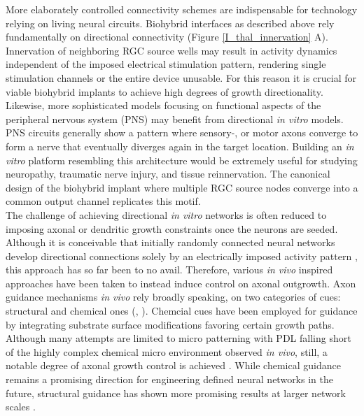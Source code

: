 More elaborately controlled connectivity schemes are indispensable for
technology relying on living neural circuits. Biohybrid interfaces as described
above rely fundamentally on directional connectivity (Figure
\ref{I_thal_innervation} A). Innervation of neighboring RGC source wells may
result in activity dynamics independent of the imposed electrical stimulation
pattern, rendering single stimulation channels or the entire device unusable.
For this reason it is crucial for viable biohybrid implants to achieve high
degrees of growth directionality. \\
Likewise, more sophisticated models focusing on functional aspects of the
peripheral nervous system (PNS) may benefit from directional \textit{in vitro}
models. PNS circuits generally show a pattern where sensory-, or motor axons
converge to form a nerve that eventually diverges again in the target location.
Building an \textit{in vitro} platform resembling this architecture would be
extremely useful for studying neuropathy, traumatic nerve injury, and tissue
reinnervation. The canonical design of the biohybrid implant where multiple RGC
source nodes converge into a common output channel replicates this motif. \\


The challenge of achieving directional \textit{in vitro} networks is often
reduced to imposing axonal or dendritic growth constraints once the neurons are
seeded. Although it is conceivable that initially randomly connected neural
networks develop directional connections solely by an electrically imposed
activity pattern \parencite{stdp}, this approach has so far been to no avail.
Therefore, various \textit{in vivo} inspired approaches have been taken to
instead induce control on axonal outgrowth. Axon guidance mechanisms \textit{in
vivo} rely broadly speaking, on two categories of cues: structural and chemical
ones (\cite{mechanicalcues}, \cite{chemicalcues}). Chemcial cues have been
employed for guidance by integrating substrate surface modifications favoring
certain growth paths. Although many attempts are limited to micro patterning
with PDL falling short of the highly complex chemical micro environment observed
\textit{in vivo}, still, a notable degree of axonal growth control is achieved
\parencite{singlecellmCP}. While chemical guidance remains a promising direction
for engineering defined neural networks in the future, structural guidance has
shown more promising results at larger network scales \parencite{forro}. 

